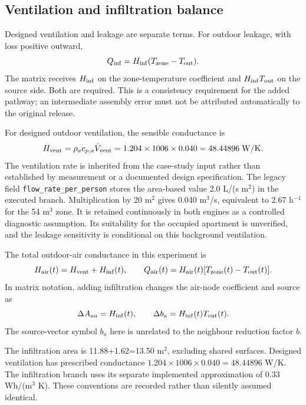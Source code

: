 \subsection{Ventilation and infiltration balance}
\label{app:airflow}
Designed ventilation and leakage are separate terms. For outdoor leakage, with loss positive outward,
\begin{equation}
Q_{\rm inf}=H_{\rm inf}(T_{\rm zone}-T_{\rm out}).
\end{equation}
The matrix receives $H_{\rm inf}$ on the zone-temperature coefficient and $H_{\rm inf}T_{\rm out}$ on the source side. Both are required. This is a consistency requirement for the added pathway; an intermediate assembly error must not be attributed automatically to the original release.

For designed outdoor ventilation, the sensible conductance is
\begin{equation}
H_{\rm vent}=\rho_a c_{p,a}\dot V_{\rm vent}
=1.204\times1006\times0.040=48.44896\;\mathrm{W/K}.
\end{equation}
The ventilation rate is inherited from the case-study input rather than established by measurement or a documented design specification. The legacy field \nolinkurl{flow_rate_per_person} stores the area-based value 2.0 L/(s m$^2$) in the executed branch. Multiplication by 20 m$^2$ gives 0.040 m$^3$/s, equivalent to 2.67 h$^{-1}$ for the 54 m$^3$ zone. It is retained continuously in both engines as a controlled diagnostic assumption. Its suitability for the occupied apartment is unverified, and the leakage sensitivity is conditional on this background ventilation.

The total outdoor-air conductance in this experiment is
\begin{equation}
H_{\rm air}(t)=H_{\rm vent}+H_{\rm inf}(t),\qquad
Q_{\rm air}(t)=H_{\rm air}(t)[T_{\rm zone}(t)-T_{\rm out}(t)].
\end{equation}
In matrix notation, adding infiltration changes the air-node coefficient and source as
\begin{equation}
\Delta A_{aa}=H_{\rm inf}(t),\qquad
\Delta b_a=H_{\rm inf}(t)T_{\rm out}(t).
\end{equation}
The source-vector symbol $b_a$ here is unrelated to the neighbour reduction factor $b$.

The infiltration area is 11.88+1.62=13.50 m$^2$, excluding shared surfaces. Designed ventilation has prescribed conductance $1.204\times1006\times0.040=48.44896$ W/K. The infiltration branch uses its separate implemented approximation of 0.33 Wh/(m$^3$ K). These conventions are recorded rather than silently assumed identical.


